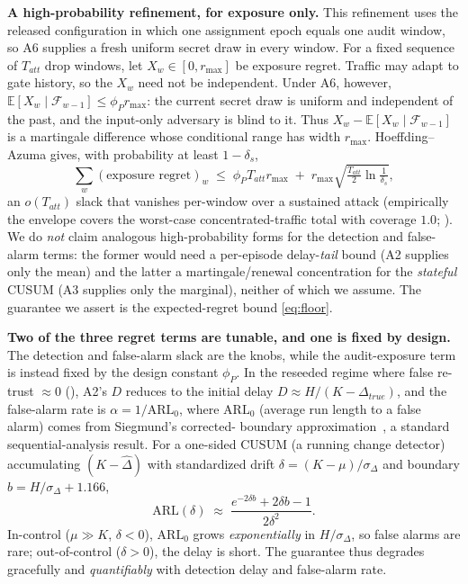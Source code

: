 \documentclass{article}
\newcommand{\dhat}{\hat{\Delta}}
\newcommand{\rmax}{r_{\max}}
\newcommand{\sigd}{\sigma_{\Delta}}
\begin{document}
\textbf{A high-probability refinement, for exposure only.} This refinement uses
the released configuration in which one assignment epoch equals one audit window,
so A6 supplies a fresh uniform secret draw in every window. For a fixed sequence
of $T_{att}$ drop windows, let $X_w\in[0,\rmax]$ be exposure regret. Traffic may
adapt to gate history, so the $X_w$ need not be independent. Under A6, however,
$\mathbb{E}[X_w\mid\mathcal{F}_{w-1}]\le\phi_P\rmax$: the current secret draw is
uniform and independent of the past, and the input-only adversary is blind to it.
Thus $X_w-\mathbb{E}[X_w\mid\mathcal{F}_{w-1}]$ is a martingale difference whose
conditional range has width $\rmax$. Hoeffding--Azuma gives, with probability at
least $1-\delta_s$,
\begin{equation}\label{eq:floorhp}
\textstyle\sum_{w}(\text{exposure regret})_w \;\le\; \phi_P T_{att}\rmax \;+\; \rmax\sqrt{\tfrac{T_{att}}{2}\ln\tfrac1{\delta_s}},
\end{equation}
an $o(T_{att})$ slack that vanishes per-window over a sustained attack (empirically the envelope
covers the worst-case concentrated-traffic total with coverage $1.0$; ).
We do \emph{not} claim analogous high-probability forms for the detection and false-alarm terms:
the former would need a per-episode delay-\emph{tail} bound (A2 supplies only the mean) and the
latter a martingale/renewal concentration for the \emph{stateful} CUSUM (A3 supplies only the
marginal), neither of which we assume. The guarantee we assert is the expected-regret bound
\cref{eq:floor}.

\textbf{Two of the three regret terms are tunable, and one is fixed by design.} The detection and false-alarm slack are the  knobs, while the
audit-exposure term is instead fixed by the design constant $\phi_P$. In the reseeded regime
where false re-trust $\approx0$ (), A2's $D$ reduces to the initial delay
$D\approx H/(K-\Delta_{true})$, and the false-alarm rate is
$\alpha=1/\mathrm{ARL}_0$, where $\mathrm{ARL}_0$ (average run length to a false alarm) comes from Siegmund's corrected-
boundary approximation~\citep{siegmund1985sequential}, a standard sequential-analysis result. For a one-sided CUSUM (a running change detector)
accumulating $(K-\dhat)$ with standardized drift $\delta=(K-\mu)/\sigd$ and
boundary $b=H/\sigd+1.166$,
\begin{equation}\label{eq:siegmund}
\mathrm{ARL}(\delta)\;\approx\;\frac{e^{-2\delta b}+2\delta b-1}{2\delta^2}.
\end{equation}
In-control ($\mu\!\gg\!K$, $\delta\!<\!0$), $\mathrm{ARL}_0$ grows
\emph{exponentially} in $H/\sigd$, so false alarms are rare; out-of-control
($\delta\!>\!0$), the delay is short. The guarantee thus degrades gracefully and
\emph{quantifiably} with detection delay and false-alarm rate.
\end{document}
